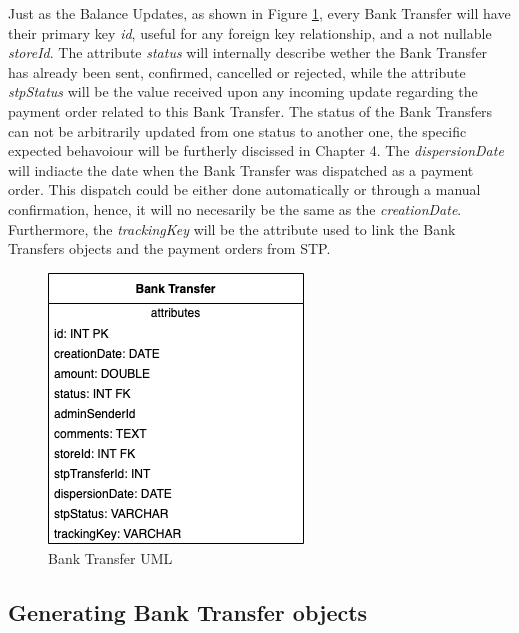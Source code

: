 Just as the Balance Updates, as shown in Figure \ref{fig:uml_bank_transfers}, every Bank Transfer will have their primary key \textit{id}, useful for any foreign key relationship, and a not nullable \textit{storeId}. The attribute \textit{status} will internally describe wether the Bank Transfer has already been sent, confirmed, cancelled or rejected, while the attribute \textit{stpStatus} will be the value received upon any incoming update regarding the payment order related to this Bank Transfer. The status of the Bank Transfers can not be arbitrarily updated from one status to another one, the specific expected behavoiour will be furtherly discissed in Chapter 4.
The \textit{dispersionDate} will indiacte the date when the Bank Transfer was dispatched as a payment order. This dispatch could be either done automatically or through a manual confirmation, hence, it will no necesarily be the same as the \textit{creationDate}. Furthermore, the \textit{trackingKey} will be the attribute used to link the Bank Transfers objects and the payment orders from STP.

\begin{figure} [H]
    \centering
    \includegraphics[scale = 0.7]{assets/uml/BankTransfers.png}
    \caption{Bank Transfer UML}\label{fig:uml_bank_transfers}
\end{figure}

\subsection{Generating Bank Transfer objects}

